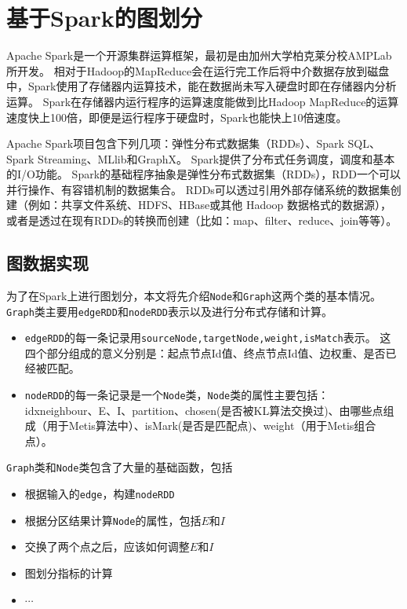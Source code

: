 \section{基于Spark的图划分}

Apache Spark是一个开源集群运算框架，最初是由加州大学柏克莱分校AMPLab所开发。
相对于Hadoop的MapReduce会在运行完工作后将中介数据存放到磁盘中，Spark使用了存储器内运算技术，能在数据尚未写入硬盘时即在存储器内分析运算。
Spark在存储器内运行程序的运算速度能做到比Hadoop MapReduce的运算速度快上100倍，即便是运行程序于硬盘时，Spark也能快上10倍速度。

Apache Spark项目包含下列几项：弹性分布式数据集（RDDs）、Spark SQL、Spark Streaming、MLlib和GraphX。
Spark提供了分布式任务调度，调度和基本的I/O功能。
Spark的基础程序抽象是弹性分布式数据集（RDDs），RDD一个可以并行操作、有容错机制的数据集合。
RDDs可以透过引用外部存储系统的数据集创建（例如：共享文件系统、HDFS、HBase或其他 Hadoop 数据格式的数据源），
或者是透过在现有RDDs的转换而创建（比如：map、filter、reduce、join等等）。 

\subsection{图数据实现}

为了在Spark上进行图划分，本文将先介绍\texttt{Node}和\texttt{Graph}这两个类的基本情况。
\texttt{Graph}类主要用\texttt{edgeRDD}和\texttt{nodeRDD}表示以及进行分布式存储和计算。

\begin{itemize}
    \item \texttt{edgeRDD}的每一条记录用\texttt{sourceNode,targetNode,weight,isMatch}表示。
    这四个部分组成的意义分别是：起点节点Id值、终点节点Id值、边权重、是否已经被匹配。
    
    \item \texttt{nodeRDD}的每一条记录是一个\texttt{Node}类，\texttt{Node}类的属性主要包括：
    idxneighbour、E、I、partition、chosen(是否被KL算法交换过)、由哪些点组成（用于Metis算法中）、isMark(是否是匹配点)、weight（用于Metis组合点）。

\end{itemize}

\texttt{Graph}类和\texttt{Node}类包含了大量的基础函数，包括
\begin{itemize}
    \item 根据输入的\texttt{edge}，构建\texttt{nodeRDD}
    \item 根据分区结果计算\texttt{Node}的属性，包括$E$和$I$
    \item 交换了两个点之后，应该如何调整$E$和$I$
    \item 图划分指标的计算
    \item $\cdots$
\end{itemize}

